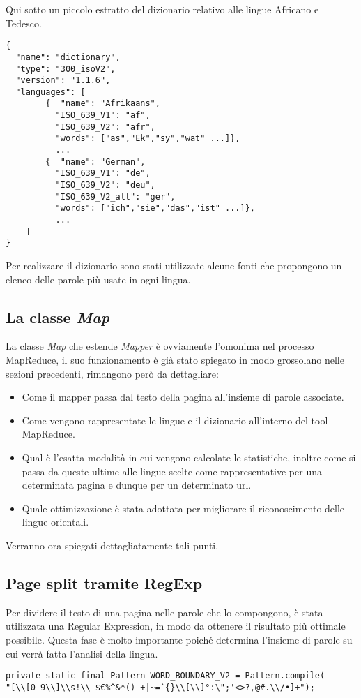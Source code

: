 \documentclass{article}
\newcommand{\MR}{MapReduce}
\newcommand{\class}[1]{\textit{#1}}
\begin{document}
Qui sotto un piccolo estratto del dizionario relativo alle lingue Africano e Tedesco.
\begin{verbatim}
{
  "name": "dictionary",
  "type": "300_isoV2",
  "version": "1.1.6",
  "languages": [
        {  "name": "Afrikaans",
          "ISO_639_V1": "af",
          "ISO_639_V2": "afr",
          "words": ["as","Ek","sy","wat" ...]}, 
          ...
        {  "name": "German",
          "ISO_639_V1": "de",
          "ISO_639_V2": "deu",
          "ISO_639_V2_alt": "ger",
          "words": ["ich","sie","das","ist" ...]}, 
          ...
    ]
}
\end{verbatim}

Per realizzare il dizionario sono stati utilizzate alcune fonti che propongono un elenco delle parole più usate in ogni lingua.\cite{1000words}\cite{101languages}

\subsection{La classe \class{Map}}
La classe \class{Map} che estende \class{Mapper} è ovviamente l'omonima nel processo \MR{}, il suo funzionamento è già stato spiegato in modo grossolano nelle sezioni precedenti, rimangono però da dettagliare:
\begin{itemize}
    \item Come il mapper passa dal testo della pagina all'insieme di parole associate.
    \item Come vengono rappresentate le lingue e il dizionario all'interno del tool \MR{}.
    \item Qual è l'esatta modalità in cui vengono calcolate le statistiche, inoltre come si passa da queste ultime alle lingue scelte come rappresentative per una determinata pagina e dunque per un determinato url.
    \item Quale ottimizzazione è stata adottata per migliorare il riconoscimento delle lingue orientali.
\end{itemize}
Verranno ora spiegati dettagliatamente tali punti.

\subsection{Page split tramite RegExp}
Per dividere il testo di una pagina nelle parole che lo compongono, è stata utilizzata una Regular Expression, in modo da ottenere il risultato più ottimale possibile. Questa fase è molto importante poiché determina l'insieme di parole su cui verrà fatta l'analisi della lingua.
\begin{verbatim}
private static final Pattern WORD_BOUNDARY_V2 = Pattern.compile(
"[\\[0-9\\]\\s!\\-$€%^&*()_+|~=`{}\\[\\]°:\";'<>?,@#.\\/•]+");
\end{verbatim}
\end{document}

